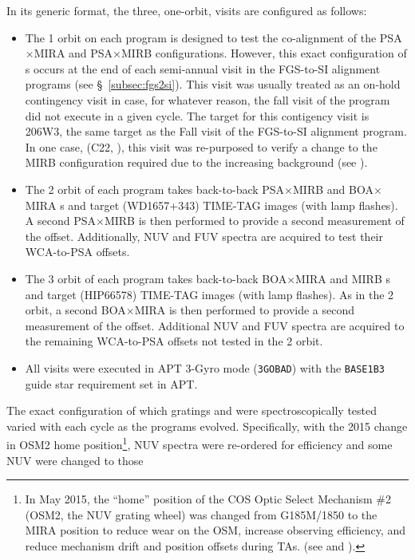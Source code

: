In its generic format, the three, one-orbit, visits are configured as follows:
\begin{itemize}
	\item{The 1 orbit on each program is designed to test the co-alignment of the PSA$\times$MIRA and PSA$\times$MIRB  configurations.
However, this exact configuration of s occurs at the end of each semi-annual visit in the FGS-to-SI alignment programs (see \S~\ref{subsec:fgs2si}).
This visit was usually treated as an on-hold contingency visit in case, for whatever reason, the fall visit of the program did not execute in a given cycle.
The target for this contigency visit is 206W3, the same target as the Fall visit of the FGS-to-SI alignment program.
In one case, (C22, ), this visit was re-purposed to verify a change to the MIRB configuration required due to the increasing background (see ).}
	\item{The 2 orbit of each program takes back-to-back PSA$\times$MIRB and BOA$\times$MIRA s and target (WD1657+343) TIME-TAG images (with lamp flashes).
	A second PSA$\times$MIRB  is then performed to provide a second measurement of the offset.
	Additionally, NUV and FUV spectra are acquired to test their WCA-to-PSA offsets.}
	\item{The 3 orbit of each program takes back-to-back BOA$\times$MIRA and MIRB s and target (HIP66578) TIME-TAG images (with lamp flashes).
	As in the 2 orbit, a second BOA$\times$MIRA  is then performed to provide a second measurement of the offset.
	Additional NUV and FUV spectra are acquired to the remaining WCA-to-PSA offsets not tested in the 2 orbit.}
	\item{All visits were executed in APT 3-Gyro mode (\texttt{3GOBAD}) with the \texttt{BASE1B3} guide star requirement set in APT.}
\end{itemize}
The exact configuration of which gratings and \cenwaves{} were spectroscopically tested varied with each cycle as the programs evolved.
Specifically, with the 2015 change in OSM2 home position\footnote{In May 2015, the ``home'' position of the COS Optic Select Mechanism \#2 (OSM2, the NUV grating wheel) was changed from G185M/1850 to the MIRA position to reduce wear on the OSM, increase observing efficiency, and reduce mechanism drift and position offsets during  TAs. (see  and ).}, NUV spectra were re-ordered for efficiency and some NUV \cenwaves{} were changed to those
